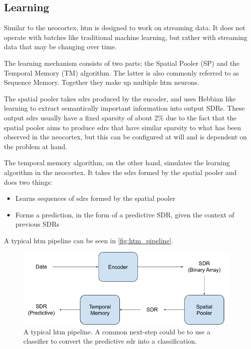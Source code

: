 \subsection{Learning}
Similar to the neocortex, \gls*{htm} is designed to work on streaming data. It does not operate with batches like traditional machine learning, but rather with streaming data that may be changing over time. \par
The learning mechanism consists of two parts; the Spatial Pooler (SP) and the Temporal Memory (TM) algorithm. The latter is also commonly referred to as Sequence Memory. Together they make up multiple \gls*{htm} neurons.\par
The spatial pooler takes \glspl*{sdr} produced by the encoder, and uses Hebbian like learning to extract semantically important information into output SDRs. These output \glspl*{sdr} usually have a fixed sparsity of about 2\% due to the fact that the spatial pooler aims to produce \glspl*{sdr} that have similar sparsity to what has been observed in the neocortex, but this can be configured at will and is dependent on the problem at hand.\par
The temporal memory algorithm, on the other hand, simulates the learning algorithm in the neocortex. It takes the \glspl*{sdr} formed by the spatial pooler and does two things:
\begin{itemize}
    \item Learns sequences of \glspl*{sdr} formed by the spatial pooler
    \item Forms a prediction, in the form of a predictive SDR,  given the context of previous SDRs
\end{itemize}
A typical \gls*{htm} pipeline can be seen in \autoref{fig:htm_pipeline}.
\begin{figure}[htb]
    \centering
    \includegraphics[width=0.7\linewidth]{resources/related_works/htm_pipeline.png}
    \caption[The HTM Pipeline]{A typical \gls*{htm} pipeline. A common next-step could be to use a classifier to convert the predictive \gls*{sdr} into a classification. }
    \label{fig:htm_pipeline}
\end{figure}
\par
